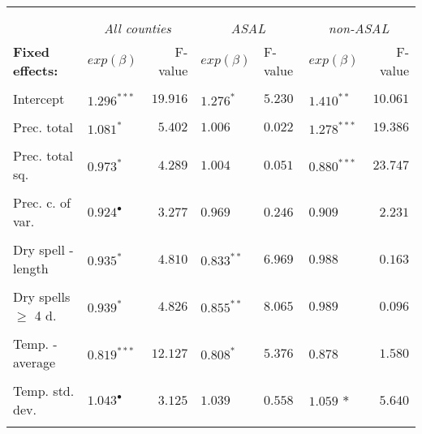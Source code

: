 \documentclass[a4paper,12pt]{article}
\begin{document}
\begin{itemize}
{\begin{threeparttable}
\begin{footnotesize}
\begin{tabular}{llrlllr}
\hline \vspace{-0.2cm} \\
\vspace{-0.2cm} \\
  \multicolumn{1}{l}{\vspace{0.1cm}\textbf{ }}  &\multicolumn{2}{c}{\textit{All counties}} &\multicolumn{2}{c}{\textit{ASAL}} &\multicolumn{2}{c}{\textit{non-ASAL}}\\
    \multicolumn{1}{l}{\vspace{0.1cm}\textbf{Fixed effects:}}&$exp(\beta)$&F-value\tnote{a}%
    &$exp(\beta)$&F-value\tnote{a}&$exp(\beta)$&F-value\tnote{a}\\
 \hline 
\hline
\\
\vspace{-0.2cm}Intercept&$1.296^{***}$&$19.916$&$1.276^{*}$&$5.230$&$1.410^{**}$&$10.061$\\
  \\
\vspace{-0.2cm}Prec. total&$1.081^{*}$&$5.402$&$1.006^{}$&$0.022$&$1.278^{***}$&$19.386$\\
  \\
  \vspace{-0.2cm}Prec. total sq.&$0.973^{*}$&$4.289$&$1.004$&$0.051$&$0.880^{***}$&$23.747$\\
    \\
      \vspace{-0.2cm}Prec. c. of var.&$0.924^{\bullet}$&$3.277$&$0.969$ &$0.246$&$0.909^{}$&$2.231$\\
  \\

         \vspace{-0.2cm}Dry spell -length&$0.935^{*}$&$4.810$&$0.833^{**}$&$6.969$&$ 0.988^{}$&$0.163$\\
  \\
        \vspace{-0.2cm}Dry spells 	$\geq$ 4 d.&$0.939^{*}$&$4.826$&$0.855^{**}$&$8.065$&$0.989^{}$&$0.096$\\
  \\
          \vspace{-0.2cm}Temp. - average&$0.819^{***}$&$12.127$&$0.808^{*}$&$5.376$&$0.878$ $^{}$&$1.580$\\
  \\
  
          \vspace{-0.2cm}Temp. std. dev.&$1.043^{\bullet}$&$3.125$&$1.039$&$0.558$&$1.059$ ${*}$&$5.640$\\
  \\


\end{tabular}
\end{footnotesize}
\end{threeparttable}}
\end{itemize}
\end{document}
